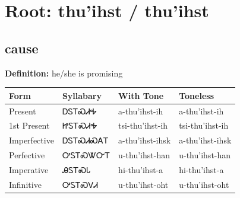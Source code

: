 \documentclass{article}%
\begin{document}
%
\normalsize%
\section*{Root: thu'ihst / thu'ihst}%
\subsection*{cause}%
\textbf{Definition: }%
he/she is promising%
\\[0.5em]%
\begin{tabular}{|l|l|l|l|}%
\hline%
\textbf{Form}&\textbf{Syllabary}&\textbf{With Tone}&\textbf{Toneless}\\%
\hline%
Present&ᎠᏚᎢᏍᏗᎭ&a{-}thu'ihst{-}ih&a{-}thu'ihst{-}ih\\%
1st Present&ᏥᏚᎢᏍᏗᎭ&tsi{-}thu'ihst{-}ih&tsi{-}thu'ihst{-}ih\\%
Imperfective&ᎠᏚᎢᏍᏗᏍᎪᎢ&a{-}thu'ihst{-}ihsk&a{-}thu'ihst{-}ihsk\\%
Perfective&ᎤᏚᎢᏍᏔᏅᎢ&u{-}thu'ihst{-}han&u{-}thu'ihst{-}han\\%
Imperative&ᎯᏚᎢᏍᏓ&hi{-}thu'ihst{-}a&hi{-}thu'ihst{-}a\\%
Infinitive&ᎤᏚᎢᏍᏙᏗ&u{-}thu'ihst{-}oht&u{-}thu'ihst{-}oht\\%
\hline%
\end{tabular}%
\\[1em]%
\end{document}
